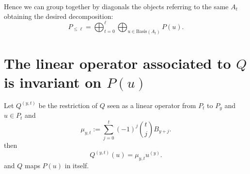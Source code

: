 \documentclass[a4paper,twoside,justified]{tufte-handout}
\begin{document}
\medskip
Hence we can group together by diagonals the objects referring to the same $A_t$ obtaining the desired decomposition:
\begin{equation*}
P_{\leq \ell}=\bigoplus_{t=0}^{\ell}\bigoplus_{u \in \mathrm{Basis}(A_t)}P(u).
\end{equation*}

\section{The linear operator associated to $Q$ is invariant on $P(u)$}


\begin{proposition} \label{prop:change-of-basis}
Let $Q^{(y,t)}$ be the restriction of $Q$ seen as a linear operator from $P_t$ to $P_y$ and $u\in P_t$ and 
$$
\mu_{y,t}:=\sum_{j=0}^t (-1)^j{t \choose j}B_{y+j}.
$$
then 
$$
Q^{(y,t)}(u)=\mu_{y,t}u^{(y)}.
$$
and $Q$ maps $P(u)$ in itself.
\end{proposition}
\end{document}
